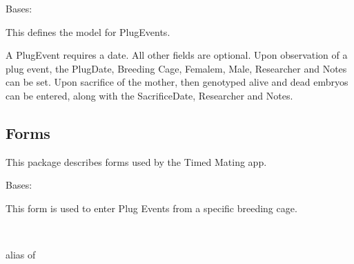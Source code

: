 \documentclass[letterpaper,10pt,english]{sphinxmanual}
\begin{document}
\begin{fulllineitems}
Bases: 


This defines the model for PlugEvents.


A PlugEvent requires a date.  All other fields are optional.
Upon observation of a plug event, the PlugDate, Breeding Cage, Femalem, Male, Researcher and Notes can be set.
Upon sacrifice of the mother, then genotyped alive and dead embryos can be entered, along with the SacrificeDate, Researcher and Notes.


\end{fulllineitems}



\subsection{Forms}
\label{api:id7}\label{api:module-timed_mating.forms}
This package describes forms used by the Timed Mating app.


\begin{fulllineitems}
\label{api:timed_mating.forms.BreedingPlugForm}
Bases: 


This form is used to enter Plug Events from a specific breeding cage.


\begin{fulllineitems}
\label{api:timed_mating.forms.BreedingPlugForm.Meta}~

\begin{fulllineitems}
\label{api:timed_mating.forms.BreedingPlugForm.Meta.model}
alias of 


\end{fulllineitems}


\end{fulllineitems}


\begin{fulllineitems}
\label{api:timed_mating.forms.BreedingPlugForm.media}
\end{fulllineitems}


\end{fulllineitems}
\end{document}
